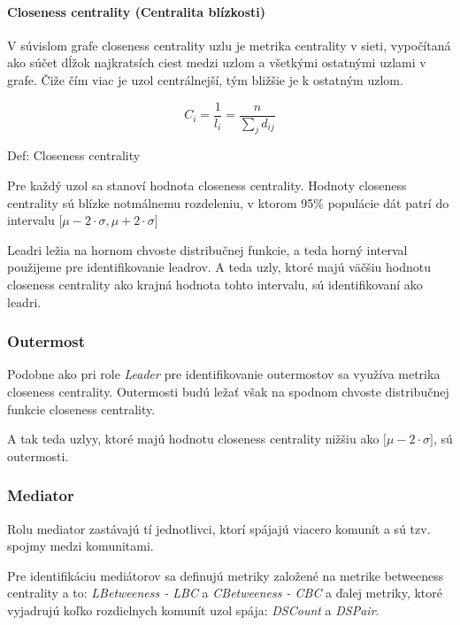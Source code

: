 \documentclass[slovak,master,public,dept460,male,cpdeclaration,oneside]{diploma}
\begin{document}
\paragraph{Closeness centrality (Centralita blízkosti)}
\hfill \break
V súvislom grafe closeness centrality uzlu je metrika centrality v sieti, vypočítaná ako súčet dĺžok najkratsích ciest medzi uzlom a všetkými ostatnými uzlami v grafe. Čiže čím viac je uzol centrálnejší, tým bližšie je k ostatným uzlom.


\begin{mycapequ}[!ht]
      \begin{equation*}
     C_{i} = \frac{1}{l_{i}}=\frac{n}{\sum_{j}d_{ij}}
   \end{equation*}
   \caption{Def: Closeness centrality}
\end{mycapequ}


\begin{sloppypar}
Pre každý uzol sa stanoví hodnota closeness centrality. Hodnoty closeness centrality sú blízke notmálnemu rozdeleniu, v ktorom 95\% populácie dát patrí do intervalu ${\big[ \mu - 2\cdot\sigma, \mu + 2\cdot\sigma \big]}$
\end{sloppypar}

Leadri ležia na hornom chvoste distribučnej funkcie, a teda horný interval použijeme pre identifikovanie leadrov. A teda uzly, ktoré majú väčšiu hodnotu closeness centrality ako krajná hodnota tohto intervalu, sú identifikovaní ako leadri.

\subsubsection{Outermost}
Podobne ako pri role \textit{Leader} pre identifikovanie outermostov sa využíva metrika closeness centrality. Outermosti budú ležať však na spodnom chvoste distribučnej funkcie closeness centrality.

A tak teda uzlyy, ktoré majú hodnotu closeness centrality nižšiu ako ${\big[ \mu - 2\cdot\sigma \big]}$, sú outermosti.

\subsubsection{Mediator}
Rolu mediator zastávajú tí jednotlivci, ktorí spájajú viacero komunít a sú tzv. spojmy medzi komunitami. 


Pre identifikáciu mediátorov sa definujú metriky založené na metrike betweeness centrality a to:  \textit{LBetweeness - LBC} a \textit{CBetweeness - CBC} a ďalej metriky, ktoré vyjadrujú koľko rozdielnych komunít uzol spája: \textit{DSCount} a \textit{DSPair}.
\end{document}
